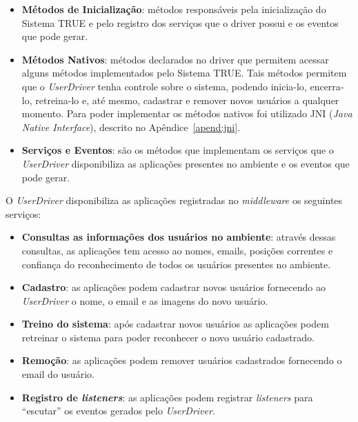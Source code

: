 \begin{itemize}
	\item \textbf{Métodos de Inicialização}: métodos responsáveis pela inicialização do Sistema TRUE e pelo registro dos serviços que o driver possui e os eventos que pode gerar.

	\item \textbf{Métodos Nativos}: métodos declarados no driver que permitem acessar alguns métodos implementados pelo Sistema TRUE. Tais métodos permitem que o \textit{UserDriver} tenha controle sobre o sistema, podendo inicia-lo, encerra-lo, retreina-lo e, até mesmo, cadastrar e remover novos usuários a qualquer momento. Para poder implementar os métodos nativos foi utilizado JNI (\textit{Java Native Interface}), descrito no Apêndice~\ref{apend:jni}.

	\item \textbf{Serviços e Eventos}: são os métodos que implementam os serviços que o \textit{UserDriver} disponibiliza as aplicações presentes no ambiente e os eventos que pode gerar. 


\end{itemize}



	O \textit{UserDriver} disponibiliza as aplicações registradas no
	\textit{middleware} os seguintes serviços:

	\begin{itemize}
		\item \textbf{Consultas as informações dos usuários no ambiente}: através dessas consultas, as aplicações tem acesso ao nomes, emails, posições correntes e confiança do reconhecimento de todos os usuários presentes no ambiente.
		\item \textbf{Cadastro}: as aplicações podem cadastrar novos usuários fornecendo ao \textit{UserDriver} o nome, o email e as imagens do novo usuário.
		\item \textbf{Treino do sistema}: após cadastrar novos usuários as aplicações podem retreinar o sistema para poder reconhecer o novo usuário cadastrado.
		\item \textbf{Remoção}: as aplicações podem remover usuários cadastrados fornecendo o email do usuário.
		\item \textbf{Registro de \textit{listeners}}: as aplicações podem registrar \textit{listeners} para ``escutar'' os eventos gerados pelo \textit{UserDriver}.
	\end{itemize}

